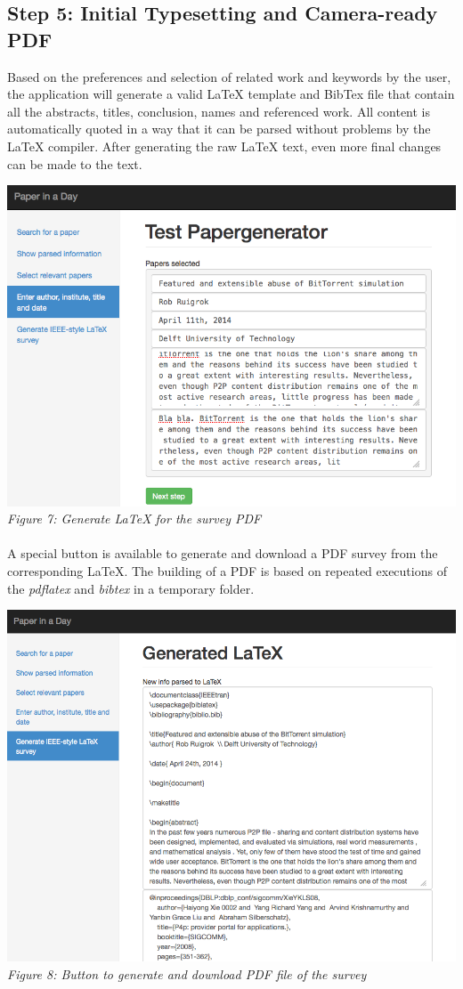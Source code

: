 \documentclass[12pt]{article}
\begin{document}
\subsection{Step 5: Initial Typesetting and Camera-ready PDF}
Based on the preferences and selection of related work and keywords by the user, the application will generate a valid LaTeX template and BibTex file that contain all the abstracts, titles, conclusion, names and referenced work. All content is automatically quoted in a way that it can be parsed without problems by the LaTeX compiler. After generating the raw LaTeX text, even more final changes can be made to the text.


\includegraphics[width=17cm]{../screenshots/new-info.png}
\textit{\\Figure 7: Generate LaTeX for the survey PDF}\\\\


A special button is available to generate and download a PDF survey from the corresponding LaTeX. The building of a PDF is based on repeated executions of the \textit{pdflatex} and \textit{bibtex} in a temporary folder.

\includegraphics[width=17cm]{../screenshots/generated-latex.png}
\textit{\\Figure 8: Button to generate and download PDF file of the survey}\\\\
\end{document}
